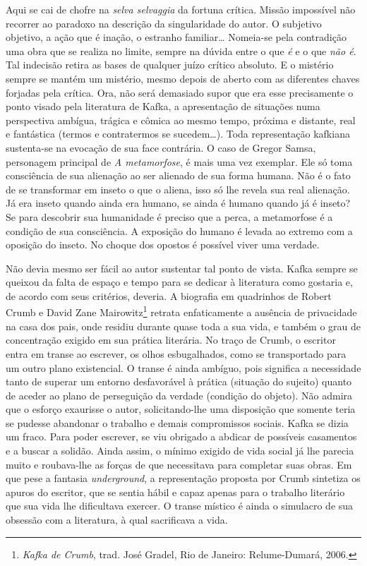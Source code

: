 Aqui se cai de chofre na \textit{selva selvaggia} da fortuna crítica.
Missão impossível não recorrer ao paradoxo na descrição da
singularidade do autor. O subjetivo objetivo, a ação que é inação, o
estranho familiar\ldots{} Nomeia-se pela contradição uma obra que se
realiza no limite, sempre na dúvida entre o que \textit{é} e o que
\textit{não é}. Tal indecisão retira as bases de qualquer juízo crítico
absoluto. E o mistério sempre se mantém um mistério, mesmo depois de
aberto com as diferentes chaves forjadas pela crítica. Ora, não será
demasiado supor que era esse precisamente o ponto visado pela
literatura de Kafka, a apresentação de situações numa perspectiva
ambígua, trágica e cômica ao mesmo tempo, próxima e distante, real e
fantástica (termos e contratermos se sucedem\ldots{}). Toda representação
kafkiana sustenta-se na evocação de sua face contrária. O caso de Gregor
Samsa, personagem principal de \textit{A metamorfose}, é mais uma vez
exemplar. Ele só toma consciência de sua alienação ao ser alienado de
sua forma humana. Não é o fato de se transformar em inseto o que o
aliena, isso só lhe revela sua real alienação. Já era inseto quando
ainda era humano, se ainda é humano quando já é inseto? 
Se para descobrir sua humanidade é
preciso que a perca, a metamorfose é a condição de sua consciência. A
exposição do humano é levada ao extremo com a oposição do inseto. No
choque dos opostos é possível viver uma verdade.

Não devia mesmo ser fácil ao autor sustentar tal ponto de vista. Kafka
sempre se queixou da falta de espaço e tempo para se dedicar à
literatura como gostaria e, de acordo com seus critérios, deveria. A
biografia em quadrinhos de Robert Crumb e David Zane
Mairowitz\footnote{ \textit{Kafka de Crumb}, trad. José Gradel, Rio de
Janeiro: Relume-Dumará, 2006.} retrata enfaticamente a ausência de
privacidade na casa dos pais, onde residiu durante quase toda a sua
vida, e também o grau de concentração exigido em sua prática literária.
No traço de Crumb, o escritor entra em transe ao escrever, os olhos
esbugalhados, como se transportado para um outro plano existencial. O
transe é ainda ambíguo, pois significa a necessidade tanto de superar
um entorno desfavorável à prática (situação do sujeito) quanto de
aceder ao plano de perseguição da verdade (condição do objeto). Não
admira que o esforço exaurisse o autor, solicitando-lhe uma
disposição que somente teria se pudesse abandonar o trabalho e demais
compromissos sociais. Kafka se dizia um fraco. Para poder escrever, se
viu obrigado a abdicar de possíveis casamentos e a buscar a solidão.
Ainda assim, o mínimo exigido de vida social já lhe parecia muito e
roubava-lhe as forças de que necessitava para completar suas obras.
Em que pese a fantasia \textit{underground}, a representação proposta
por Crumb sintetiza os apuros do escritor, que se sentia hábil e capaz
apenas para o trabalho literário que sua vida lhe dificultava exercer.
O transe místico é ainda o simulacro de sua obsessão com a literatura,
à qual sacrificava a vida.


